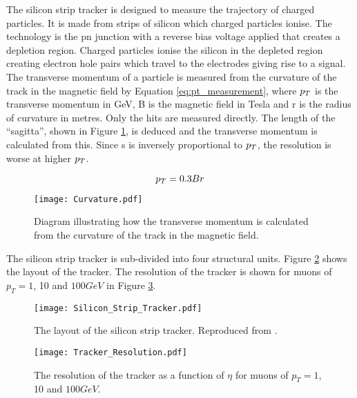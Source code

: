 The silicon strip tracker is designed to measure the trajectory of charged 
particles. It is made from strips of silicon which charged particles ionise. The
technology is the pn junction with a reverse bias voltage applied that creates
a depletion region. Charged particles ionise the silicon in the depleted region 
creating electron hole pairs which travel to the electrodes giving rise to a 
signal. \\
  
The transverse momentum of a particle is measured from the curvature of the 
track in the magnetic field by Equation \ref{eq:pt_measurement}, where $p_{T}$ is
the transverse momentum in GeV, B is the magnetic field in Tesla and r is the
radius of curvature in metres. Only the hits are measured directly. The 
length of the ``sagitta'', shown in Figure \ref{fig:curvature}, is deduced and 
the transverse momentum is calculated from this. Since s is inversely 
proportional to $p_{T}$, the resolution is worse at higher $p_{T}$.

\begin{equation}
p_{T} = 0.3Br
\label{eq:pt_measurement}
\end{equation}

\begin{figure}
\begin{center}
\texttt{[image: Curvature.pdf]}
\end{center}
\caption{Diagram illustrating how the transverse momentum is calculated from the
curvature of the track in the magnetic field.}
\label{fig:curvature}
\end{figure}

The silicon strip tracker is sub-divided into four structural units. Figure 
\ref{fig:Silicon_Strip_Tracker} shows the layout of the tracker. The resolution 
of the tracker is shown for muons of $p_{T} = 1$, 10 and $100 \unit{GeV}$ in 
Figure \ref{fig:tracker_resolution}.

\begin{figure}
\texttt{[image: Silicon\_Strip\_Tracker.pdf]}
\caption{The layout of the silicon strip tracker. Reproduced from 
\cite{physics_tdr_1}.}
\label{fig:Silicon_Strip_Tracker}
\end{figure}

\begin{figure}
\texttt{[image: Tracker\_Resolution.pdf]}
\caption{The resolution of the tracker as a function of $\eta$ for muons of
$p_{T} = 1$, 10 and $100 \unit{GeV}$.}
\label{fig:tracker_resolution}
\end{figure}

